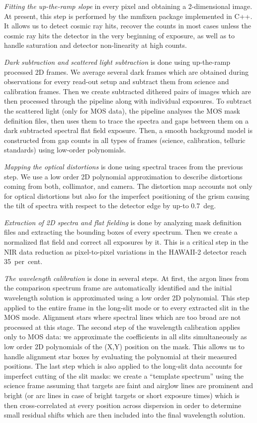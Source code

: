  \emph{Fitting the up-the-ramp slope} in every pixel and obtaining a
2-dimensional image. At present, this step is performed by the {\sc
mmfixen} package implemented in {\sc C++}. It allows us to detect cosmic ray
hits, recover the counts in most cases unless the cosmic ray hits the
detector in the very beginning of exposure, as well as to handle saturation
and detector non-linearity at high counts.

 \emph{Dark subtraction and scattered light subtraction} is done using
up-the-ramp processed 2D frames.  We average several dark frames which are
obtained during observations for every read-out setup and subtract them from
science and calibration frames.  Then we create subtracted dithered pairs of
images which are then processed through the pipeline along with individual
exposures.  To subtract the scattered light (only for MOS data), the
pipeline analyses the MOS mask definition files, then uses them to trace the
spectra and gaps between them on a dark subtracted spectral flat field
exposure.  Then, a smooth background model is constructed from gap counts in
all types of frames (science, calibration, telluric standards) using
low-order polynomials.

 \emph{Mapping the optical distortions} is done using spectral traces
from the previous step.  We use a low order 2D polynomial approximation to
describe distortions coming from both, collimator, and camera. The distortion
map accounts not only for optical distortions but also for the imperfect
positioning of the grism causing the tilt of spectra with respect to the
detector edge by up-to 0.7~deg.

 \emph{Extraction of 2D spectra and flat fielding} is done by analyzing mask
definition files and extracting the bounding boxes of every spectrum.  Then
we create a normalized flat field and correct all exposures by it.  This is
a critical step in the NIR data reduction as pixel-to-pixel variations
in the HAWAII-2 detector reach 35~per~cent.

 \emph{The wavelength calibration} is done in several steps. At first,
the argon lines from the comparison spectrum frame are automatically
identified and the initial wavelength solution is approximated using a low
order 2D polynomial.  This step applied to the entire frame in the long-slit
mode or to every extracted slit in the MOS mode.  Alignment stars where
spectral lines which are too broad are not processed at this stage.  The second
step of the wavelength calibration applies only to MOS data: we approximate
the coefficients in all slits simultaneously as low order 2D polynomials of
the (X,Y) position on the mask.  This allows us to handle alignment star
boxes by evaluating the polynomial at their measured positions.  The last
step which is also applied to the long-slit data accounts for imperfect
cutting of the slit masks: we create a ``template spectrum'' using the
science frame assuming that targets are faint and airglow lines are
prominent and bright (or arc lines in case of bright targets or short
exposure times) which is then cross-correlated at every position across
dispersion in order to determine small residual shifts which are then
included into the final wavelength solution.

